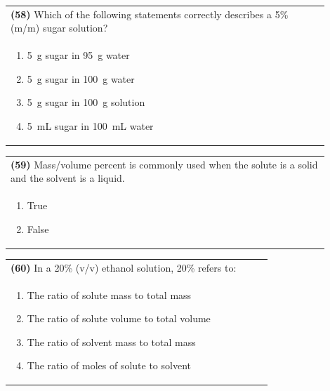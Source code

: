 \documentclass{article}
\begin{document}
\noindent\begin{tabular}{|p{0.9\linewidth}|}
\hline
\textbf{(58)} Which of the following statements correctly describes a 5\% (m/m) sugar solution?\\[0.2cm]
\begin{minipage}[t]{0.85\linewidth}
\begin{enumerate}[label=\alph*.]
\item 5~g sugar in 95~g water
\item 5~g sugar in 100~g water
\item 5~g sugar in 100~g solution
\item 5~mL sugar in 100~mL water
\end{enumerate}
\end{minipage}\\[0.2cm]
\hline
\end{tabular}

\noindent\begin{tabular}{|p{0.9\linewidth}|}
\hline
\textbf{(59)} Mass/volume percent is commonly used when the solute is a solid and the solvent is a liquid.\\[0.2cm]
\begin{minipage}[t]{0.85\linewidth}
\begin{enumerate}[label=\alph*.]
\item True
\item False
\end{enumerate}
\end{minipage}\\[0.2cm]
\hline
\end{tabular}

\noindent\begin{tabular}{|p{0.9\linewidth}|}
\hline
\textbf{(60)} In a 20\% (v/v) ethanol solution, 20\% refers to:\\[0.2cm]
\begin{minipage}[t]{0.85\linewidth}
\begin{enumerate}[label=\alph*.]
\item The ratio of solute mass to total mass
\item The ratio of solute volume to total volume
\item The ratio of solvent mass to total mass
\item The ratio of moles of solute to solvent
\end{enumerate}
\end{minipage}\\[0.2cm]
\hline
\end{tabular}
\end{document}
